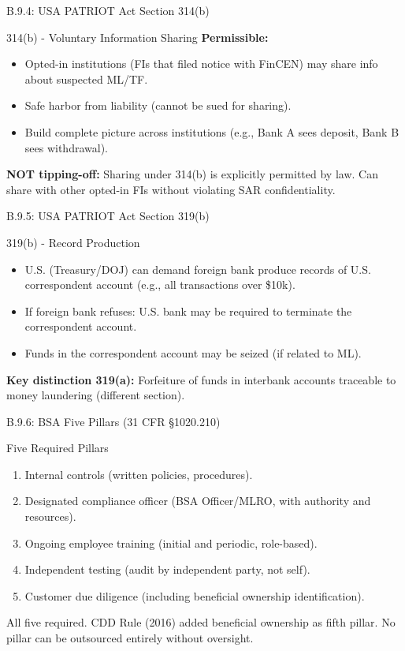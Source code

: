 \documentclass{beamer}
\begin{document}
	\begin{frame}{B.9.4: USA PATRIOT Act Section 314(b)}
		\begin{block}{314(b) - Voluntary Information Sharing}
			\textbf{Permissible:}
			\begin{itemize}
				\item Opted-in institutions (FIs that filed notice with FinCEN) may share info about suspected ML/TF.
				\item Safe harbor from liability (cannot be sued for sharing).
				\item Build complete picture across institutions (e.g., Bank A sees deposit, Bank B sees withdrawal).
			\end{itemize}
		\end{block}
		\textbf{NOT tipping-off:} Sharing under 314(b) is explicitly permitted by law. Can share with other opted-in FIs without violating SAR confidentiality.
	\end{frame}
	
	\begin{frame}{B.9.5: USA PATRIOT Act Section 319(b)}
		\begin{block}{319(b) - Record Production}
			\begin{itemize}
				\item U.S. (Treasury/DOJ) can demand foreign bank produce records of U.S. correspondent account (e.g., all transactions over \$10k).
				\item If foreign bank refuses: U.S. bank may be required to terminate the correspondent account.
				\item Funds in the correspondent account may be seized (if related to ML).
			\end{itemize}
		\end{block}
		\textbf{Key distinction 319(a):} Forfeiture of funds in interbank accounts traceable to money laundering (different section).
	\end{frame}
	
	\begin{frame}{B.9.6: BSA Five Pillars (31 CFR §1020.210)}
		\begin{block}{Five Required Pillars}
			\begin{enumerate}
				\item Internal controls (written policies, procedures).
				\item Designated compliance officer (BSA Officer/MLRO, with authority and resources).
				\item Ongoing employee training (initial and periodic, role-based).
				\item Independent testing (audit by independent party, not self).
				\item Customer due diligence (including beneficial ownership identification).
			\end{enumerate}
		\end{block}
		\textcolor{red}{\textbf{}} All five required. CDD Rule (2016) added beneficial ownership as fifth pillar. No pillar can be outsourced entirely without oversight.
	\end{frame}
	
\end{document}
